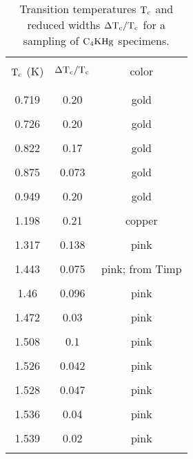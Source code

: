 \begin{table}
\caption[Transition temperatures $\rm T_c$ and reduced widths $\rm \Delta
T_c/T_c$ for a sampling of $\rm C_4KHg$ specimens.]{Transition temperatures $\rm T_c$ and reduced widths $\rm \Delta
T_c/T_c$ for a sampling of $\rm C_4KHg$ specimens.}
\label{tcfreq}
\begin{center}
\begin{tabular}{|ccc|}
\hline
& & \\
$\rm T_c$ (K) & $\rm \Delta T_c/ T_c$ & color \\
& & \\
\hline
& & \\
0.719 & 0.20 & gold \\	%
& & \\
0.726 & 0.20 & gold \\  %
& & \\
0.822 & 0.17 & gold \\	%
& & \\
0.875 & 0.073 & gold \\ %
& & \\
0.949 & 0.20   & gold \\  %
& & \\
1.198 & 0.21 & copper \\	%
& & \\
1.317 & 0.138  & pink \\	%
& & \\
1.443 & 0.075  & pink; from Timp \\ %
& & \\
1.46 & 0.096 & pink \\	%
& & \\
1.472 & 0.03 & pink \\	%
& & \\
1.508 & 0.1 & pink \\  %
& & \\
1.526 & 0.042 & pink \\	%
& & \\
1.528 & 0.047 & pink \\	%
& & \\
1.536 & 0.04 & pink \\	%
& & \\
1.539 & 0.02 & pink \\	%
& & \\
\hline
\end{tabular}
\end{center}
\end{table}

